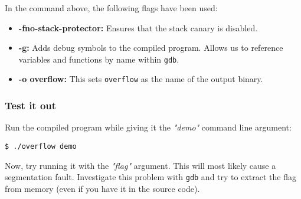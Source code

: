 In the command above, the following flags have been used:

\begin{itemize}
    \item \textbf{-fno-stack-protector:} Ensures that the stack canary is
          disabled.
    \item \textbf{-g:} Adds debug symbols to the compiled program. Allows us
          to reference variables and functions by name within \texttt{gdb}.
    \item \textbf{-o overflow:} This sets \texttt{overflow} as the name of the
          output binary.
\end{itemize}

\subsubsection{Test it out}

Run the compiled program while giving it the \textit{"demo"} command line
argument:

\begin{lstlisting}[style=bashstyle]
$ ./overflow demo
\end{lstlisting}

Now, try running it with the \textit{"flag"} argument. This will most likely
cause a segmentation fault. Investigate this problem with \texttt{gdb} and try
to extract the flag from memory (even if you have it in the source code).

